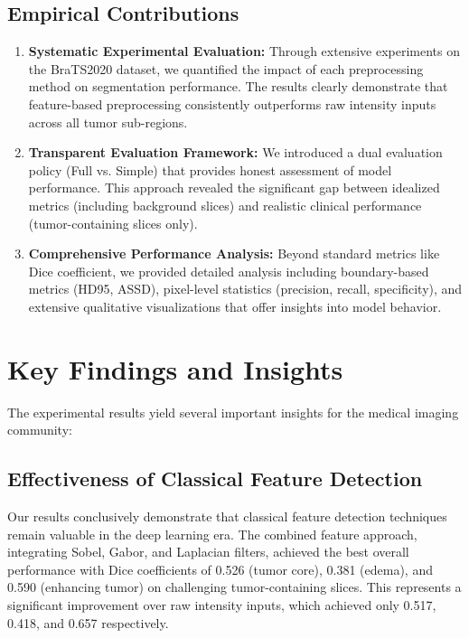 \subsection{Empirical Contributions}

\begin{enumerate}
    \item \textbf{Systematic Experimental Evaluation:} Through extensive experiments on the BraTS2020 dataset, we quantified the impact of each preprocessing method on segmentation performance. The results clearly demonstrate that feature-based preprocessing consistently outperforms raw intensity inputs across all tumor sub-regions.
    
    \item \textbf{Transparent Evaluation Framework:} We introduced a dual evaluation policy (Full vs. Simple) that provides honest assessment of model performance. This approach revealed the significant gap between idealized metrics (including background slices) and realistic clinical performance (tumor-containing slices only).
    
    \item \textbf{Comprehensive Performance Analysis:} Beyond standard metrics like Dice coefficient, we provided detailed analysis including boundary-based metrics (HD95, ASSD), pixel-level statistics (precision, recall, specificity), and extensive qualitative visualizations that offer insights into model behavior.
\end{enumerate}

\section{Key Findings and Insights}

The experimental results yield several important insights for the medical imaging community:

\subsection{Effectiveness of Classical Feature Detection}

Our results conclusively demonstrate that classical feature detection techniques remain valuable in the deep learning era. The combined feature approach, integrating Sobel, Gabor, and Laplacian filters, achieved the best overall performance with Dice coefficients of 0.526 (tumor core), 0.381 (edema), and 0.590 (enhancing tumor) on challenging tumor-containing slices. This represents a significant improvement over raw intensity inputs, which achieved only 0.517, 0.418, and 0.657 respectively.

